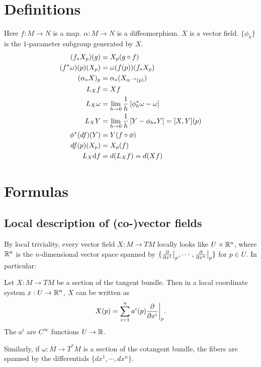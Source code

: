 \documentclass[11pt, english]{article}
\begin{document}
\newpage
\appendix
\newpage
\section{Definitions}
Here $f:M \to N$ is a map. $\alpha:M \to N$ is a diffeomorphism. $X$ is a vector field. $\{ \phi_h \}$ is the $1$-parameter subgroup generated by $X$.
\begin{align*}
  (f_\ast X_p)(g) &= X_p(g \circ f) \\
(f^\ast \omega)(p)(X_p) &= \omega(f(p))(f_\ast X_p) \\
(\alpha_\ast X)_p &= \alpha_\ast(X_{\alpha^{-1}(p)}) \\
L_X f &= Xf \\
L_X \omega &= \lim_{h \to 0} \frac 1h \left[ \phi_h^\ast \omega -\omega \right] \\
L_XY &= \lim_{h \to 0} \frac 1h \left[Y - \phi_{h \ast} Y \right] = [X,Y](p) \\
\phi^\ast(df)(Y) &= Y(f \circ \phi) \\
df(p)(X_p) &= X_p(f) \\
L_X \mathrm{d}{f} &= d(L_X f) = d(Xf) \\ 
\end{align*}

\newpage
\section{Formulas}
 
\subsection{Local description of (co-)vector fields}

By local triviality, every vector field $X:M \to TM$ locally looks like $U \times \mathbb{R}^n$, where $\mathbb{R}^n$ is the $n$-dimensional vector space spanned by $\{ \restr{\dd{}{x^1}}{p},\cdots,\restr{\dd{}{x^n}}{p} \}$ for $p \in U$. In particular:

\begin{prop}
\label{Xtriv}
Let $X:M \to TM$ be a section of the tangent bundle. Then in a local coordinate system $x:U \to \mathbb{R}^n$, $X$ can be written as
\[
X(p) = \sum_{i=1}^n  a^i(p) \restr{\dd{}{x^i}}{p}.
\]
The $a^i$ are $C^\infty$ functions $U \to \mathbb{R}$.
\end{prop}

Similarly, if $\omega:M \to T^\ast M$ is a section of the cotangent bundle, the fibers are spanned by the differentials $\{dx^1,\cdots, dx^n \}$.
\end{document}
